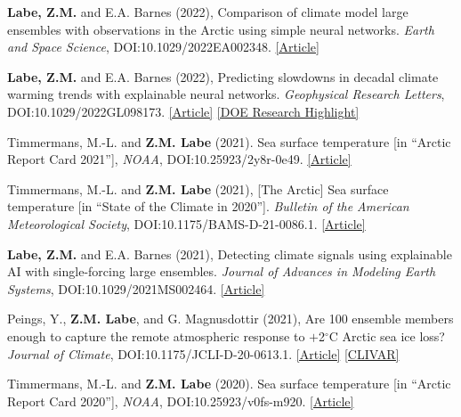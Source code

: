 \documentclass[margin,line,palatino,courier,10pt]{res}
\begin{document}
\begin{resume}
\begin{etaremune}[leftmargin=0in,topsep=0in,parsep=0in]
\item \textbf{Labe, Z.M.} and E.A. Barnes (2022), Comparison of climate model large ensembles with observations in the Arctic using simple neural networks. \textit{Earth and Space Science}, DOI:10.1029/2022EA002348. \href{https://doi.org/10.1029/2022EA002348}{[Article]}
\item \textbf{Labe, Z.M.} and E.A. Barnes (2022), Predicting slowdowns in decadal climate warming trends with explainable neural networks. \textit{Geophysical Research Letters}, DOI:10.1029/2022GL098173. \href{https://doi.org/10.1029/2022GL098173}{[Article]} \href{https://climatemodeling.science.energy.gov/research-highlights/predicting-slowdowns-decadal-climate-warming-trends-explainable-neural-networks}{[DOE Research Highlight]}
\item Timmermans, M.-L. and \textbf{Z.M. Labe} (2021). Sea surface temperature [in ``Arctic Report Card 2021''], \textit{NOAA}, DOI:10.25923/2y8r-0e49. \href{https://www.arctic.noaa.gov/Report-Card/Report-Card-2021/ArtMID/8022/ArticleID/944/Sea-Surface-Temperature}{[Article]}
\item Timmermans, M.-L. and \textbf{Z.M. Labe} (2021), [The Arctic] Sea surface temperature [in ``State of the Climate in 2020'']. \textit{Bulletin of the American Meteorological Society}, DOI:10.1175/BAMS-D-21-0086.1. \href{https://doi.org/10.1175/BAMS-D-21-0086.1}{[Article]}
\item \textbf{Labe, Z.M.} and E.A. Barnes (2021), Detecting climate signals using explainable AI with single-forcing large ensembles. \textit{Journal of Advances in Modeling Earth Systems}, DOI:10.1029/2021MS002464. \href{https://agupubs.onlinelibrary.wiley.com/doi/abs/10.1029/2021MS002464}{[Article]}
\item Peings, Y., \textbf{Z.M. Labe}, and G. Magnusdottir (2021), Are 100 ensemble members enough to capture the remote atmospheric response to $+$2$^{\circ}$C Arctic sea ice loss? \textit{Journal of Climate}, DOI:10.1175/JCLI-D-20-0613.1. \href{https://journals.ametsoc.org/view/journals/clim/aop/JCLI-D-20-0613.1/JCLI-D-20-0613.1.xml}{[Article]} \href{https://usclivar.org/research-highlights/how-reproducible-response-2degc-arctic-sea-ice-loss-large-ensemble-simulations}{[CLIVAR]}
\item Timmermans, M.-L. and \textbf{Z.M. Labe} (2020). Sea surface temperature [in ``Arctic Report Card 2020''], \textit{NOAA}, DOI:10.25923/v0fs-m920. \href{https://arctic.noaa.gov/Report-Card/Report-Card-2020/ArtMID/7975/ArticleID/885/Sea-Surface-Temperature}{[Article]}

\end{etaremune}
\end{resume}
\end{document}

